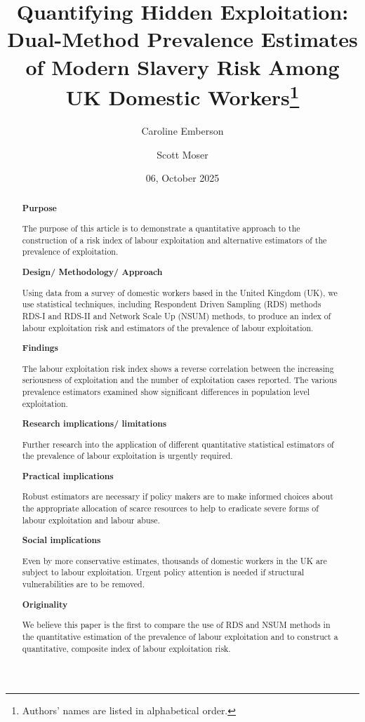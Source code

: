 \documentclass[
  12pt,
  letterpaper,
  DIV=11,
  numbers=noendperiod]{scrartcl}
\title{Quantifying Hidden Exploitation: Dual-Method Prevalence Estimates
of Modern Slavery Risk Among UK Domestic Workers\footnote{Authors' names
  are listed in alphabetical order.}}
\author{Caroline Emberson \and Scott Moser}
\date{06, October 2025}
\theoremstyle{plain}
\theoremstyle{definition}
\begin{document}
\maketitle
\begin{abstract}
\textbf{Purpose}

The purpose of this article is to demonstrate a quantitative approach to
the construction of a risk index of labour exploitation and alternative
estimators of the prevalence of exploitation.

\textbf{Design/ Methodology/ Approach}

Using data from a survey of domestic workers based in the United Kingdom
(UK), we use statistical techniques, including Respondent Driven
Sampling (RDS) methods RDS-I and RDS-II and Network Scale Up (NSUM)
methods, to produce an index of labour exploitation risk and estimators
of the prevalence of labour exploitation.

\textbf{Findings}

The labour exploitation risk index shows a reverse correlation between
the increasing seriousness of exploitation and the number of
exploitation cases reported. The various prevalence estimators examined
show significant differences in population level exploitation.

\textbf{Research implications/ limitations}

Further research into the application of different quantitative
statistical estimators of the prevalence of labour exploitation is
urgently required.

\textbf{Practical implications}

Robust estimators are necessary if policy makers are to make informed
choices about the appropriate allocation of scarce resources to help to
eradicate severe forms of labour exploitation and labour abuse.

\textbf{Social implications}

Even by more conservative estimates, thousands of domestic workers in
the UK are subject to labour exploitation. Urgent policy attention is
needed if structural vulnerabilities are to be removed.

\textbf{Originality}

We believe this paper is the first to compare the use of RDS and NSUM
methods in the quantitative estimation of the prevalence of labour
exploitation and to construct a quantitative, composite index of labour
exploitation risk.
\end{abstract}
\end{document}
